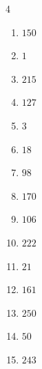 \begin{multicols}{4}
\begin{enumerate}
\resetques

  \item $150$


  \item $1$


  \item $215$


  \item $127$


  \item $3$


  \item $18$


  \item $98$


  \item $170$


  \item $106$


  \item $222$


  \item $21$


  \item $161$


  \item $250$


  \item $50$


  \item $243$


\columnbreak %


\end{enumerate}
\end{multicols}
